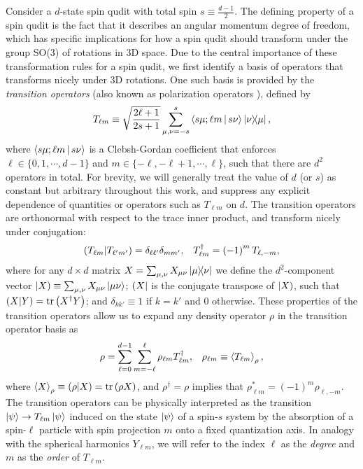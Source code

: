 \documentclass[notitlepage,twocolumn]{revtex4-2}
\newcommand{\f}[2]{\dfrac{#1}{#2}} %
\newcommand{\p}[1]{\left(#1\right)} %
\newcommand{\bk}{\Braket} %
\renewcommand{\set}[1]{\{#1\}} %
\def\obra#1{\mathinner{({#1}|}}
\def\oket#1{\mathinner{|{#1})}}
\def\obk#1{\mathinner{({#1})}}
\begin{document}
Consider a $d$-state spin qudit with total spin $s\equiv\frac{d-1}{2}$.
The defining property of a spin qudit is the fact that it describes an angular momentum degree of freedom, which has specific implications for how a spin qudit should transform under the group SO(3) of rotations in 3D space.
Due to the central importance of these transformation rules for a spin qudit, we first identify a basis of operators that transforms nicely under 3D rotations.
One such basis is provided by the {\it transition operators} (also known as polarization operators \cite{kryszewski2006positivity, bertlmann2008bloch}), defined by
\begin{align}
  T_{\ell m} \equiv \sqrt{\f{2\ell+1}{2s+1}} \sum_{\mu,\nu=-s}^s
  \bk{s\mu;\ell m|s\nu} \op{\nu}{\mu},
  \label{eq:trans_op}
\end{align}
where $\bk{s\mu;\ell m|s\nu}$ is a Clebsh-Gordan coefficient that enforces $\ell\in\set{0,1,\cdots,d-1}$ and $m\in\set{-\ell,-\ell+1,\cdots,\ell}$, such that there are $d^2$ operators in total.
For brevity, we will generally treat the value of $d$ (or $s$) as constant but arbitrary throughout this work, and suppress any explicit dependence of quantities or operators such as $T_{\ell m}$ on $d$.
The transition operators are orthonormal with respect to the trace inner product, and transform nicely under conjugation:
\begin{align}
  \obk{T_{\ell m }|T_{\ell'm'}}
  = \delta_{\ell\ell'} \delta_{mm'},
  &&
  T_{\ell m}^\dag = \p{-1}^m T_{\ell,-m},
\end{align}
where for any $d\times d$ matrix $X=\sum_{\mu,\nu} X_{\mu\nu} \op{\mu}{\nu}$ we define the $d^2$-component vector $\oket{X} \equiv \sum_{\mu,\nu} X_{\mu\nu} \ket{\mu\nu}$; $\obra{X}$ is the conjugate transpose of $\oket{X}$, such that $\obk{X|Y}=\tr\p{X^\dag Y}$; and $\delta_{kk'}\equiv 1$ if $k=k'$ and $0$ otherwise.
These properties of the transition operators allow us to expand any density operator $\rho$ in the transition operator basis as
\begin{align}
  \rho = \sum_{\ell=0}^{d-1} \sum_{m=-\ell}^\ell
  \rho_{\ell m} T_{\ell m}^\dag,
  &&
  \rho_{\ell m} \equiv \bk{T_{\ell m}}_\rho,
  \label{eq:trans_state}
\end{align}
where $\bk{X}_\rho\equiv\obk{\rho|X}=\tr\p{\rho X}$, and $\rho^\dag=\rho$ implies that $\rho_{\ell m}^*=\p{-1}^m\rho_{\ell,-m}$.
The transition operators can be physically interpreted as the transition $\ket\psi\to T_{\ell m}\ket\psi$ induced on the state $\ket\psi$ of a spin-$s$ system by the absorption of a spin-$\ell$ particle with spin projection $m$ onto a fixed quantization axis.
In analogy with the spherical harmonics $Y_{\ell m}$, we will refer to the index $\ell$ as the {\it degree} and $m$ as the {\it order} of $T_{\ell m}$.
\end{document}
